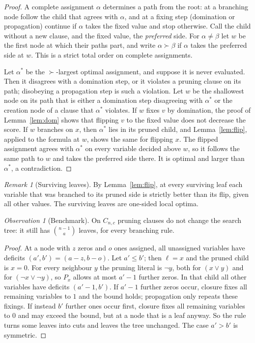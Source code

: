 \documentclass[11pt,a4paper]{article}
\theoremstyle{remark}
\newtheorem{remark}[theorem]{Remark}
\newtheorem{observation}[theorem]{Observation}
\begin{document}
\begin{proof}
A complete assignment $\alpha$ determines a path from the root: at a branching
node follow the child that agrees with $\alpha$, and at a fixing step
(domination or propagation) continue if $\alpha$ takes the fixed value and stop
otherwise. Call the child without a new clause, and the fixed value, the
\emph{preferred} side. For $\alpha\ne\beta$ let $w$ be the first node at which
their paths part, and write $\alpha\succ\beta$ if $\alpha$ takes the preferred
side at $w$. This is a strict total order on complete assignments.

Let $\alpha^*$ be the $\succ$-largest optimal assignment, and suppose it is
never evaluated. Then it disagrees with a domination step, or it violates a
pruning clause on its path; disobeying a propagation step is such a violation.
Let $w$ be the shallowest node on its path that is either a domination step
disagreeing with $\alpha^*$ or the creation node of a clause that $\alpha^*$
violates. If $w$ fixes $v$ by domination, the proof of Lemma~\ref{lem:dom}
shows that flipping $v$ to the fixed value does not decrease the score. If $w$
branches on $x$, then $\alpha^*$ lies in its pruned child, and
Lemma~\ref{lem:flip}, applied to the formula at $w$, shows the same for
flipping $x$. The flipped assignment agrees with $\alpha^*$ on every variable
decided above $w$, so it follows the same path to $w$ and takes the preferred
side there. It is optimal and larger than $\alpha^*$, a contradiction.
\end{proof}

\begin{remark}[Surviving leaves]\label{rem:localopt}
By Lemma~\ref{lem:flip}, at every surviving leaf each variable that was branched
to its pruned side is strictly better than its flip, given all other values.
The surviving leaves are one-sided local optima.
\end{remark}

\begin{observation}[Benchmark]\label{obs:cnc}
On $C_{n,c}$ pruning clauses do not change the search tree: it still has
$\binom{n-1}a$ leaves, for every branching rule.
\end{observation}

\begin{proof}
At a node with $z$ zeros and $o$ ones assigned, all unassigned variables have
deficits $(a',b')=(a-z,b-o)$. Let $a'\le b'$; then $\ell=x$ and the pruned child
is $x=0$. For every neighbour $y$ the pruning literal is $\neg y$, both for
$(x\lor y)$ and for $(\neg x\lor\neg y)$, so $P_x$ allows at most $a'-1$ further
zeros. In that child all other variables have deficits $(a'-1,b')$. If $a'-1$
further zeros occur, closure fixes all remaining variables to $1$ and the bound
holds; propagation only repeats these fixings. If instead $b'$ further ones
occur first, closure fixes all remaining variables to $0$ and may exceed the
bound, but at a node that is a leaf anyway. So the rule turns some leaves into
cuts and leaves the tree unchanged. The case $a'>b'$ is symmetric.
\end{proof}
\end{document}
